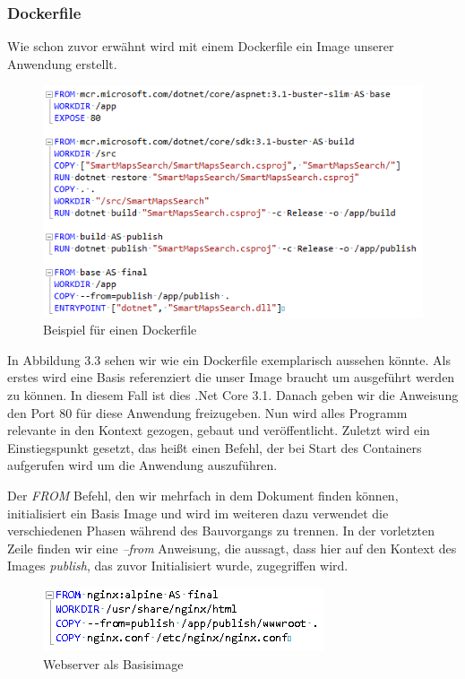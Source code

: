 \documentclass[12pt,a4paper]{scrartcl}
\begin{document}
\subsubsection{Dockerfile}

Wie schon zuvor erwähnt wird mit einem Dockerfile ein Image unserer Anwendung erstellt. 

\begin{figure}[h!]
	\centering
	\includegraphics[scale=1]{DockerfileWhite.png}
	\caption[Screenshot]{Beispiel für einen Dockerfile}
\end{figure}

In Abbildung 3.3 sehen wir wie ein Dockerfile exemplarisch aussehen könnte. Als erstes wird eine Basis referenziert die unser Image braucht um ausgeführt werden zu können. In diesem Fall ist dies .Net Core 3.1. Danach geben wir die Anweisung den Port 80 für diese Anwendung freizugeben. Nun wird alles Programm relevante in den Kontext gezogen, gebaut und veröffentlicht. Zuletzt wird ein Einstiegspunkt gesetzt, das heißt einen Befehl, der bei Start des Containers aufgerufen wird um die Anwendung auszuführen. 

Der \emph{FROM} Befehl, den wir mehrfach in dem Dokument finden können, initialisiert ein Basis Image und wird im weiteren dazu verwendet die verschiedenen Phasen während des Bauvorgangs zu trennen. In der vorletzten Zeile finden wir eine \emph{--from} Anweisung, die aussagt, dass hier auf den Kontext des Images \emph{publish}, das zuvor Initialisiert wurde, zugegriffen wird.

\begin{figure}[h!]
	\centering
	\includegraphics[scale=1]{DockerfileBlazor.png}
	\caption[Screenshot]{Webserver als Basisimage}
\end{figure}
\end{document}
